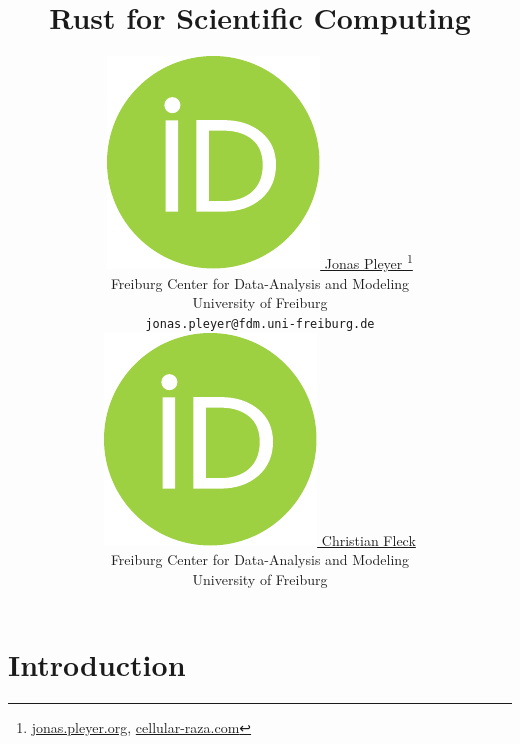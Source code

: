 \documentclass{article}
\title{Rust for Scientific Computing}
\author{
    \href{https://orcid.org/0009-0001-0613-7978}{
        \includegraphics[scale=0.06]{orcid.pdf}
        \hspace{1mm}Jonas Pleyer
    }
    \thanks{
        \href{https://jonas.pleyer.org}{jonas.pleyer.org},
        \href{https://cellular-raza.com}{cellular-raza.com}
    }\\
    Freiburg Center for Data-Analysis and Modeling\\
    University of Freiburg\\
    \texttt{jonas.pleyer@fdm.uni-freiburg.de} \\
    \And
    \href{https://orcid.org/0000-0002-6371-4495}{
        \includegraphics[scale=0.06]{orcid.pdf}
        \hspace{1mm}Christian Fleck
    }\\
    Freiburg Center for Data-Analysis and Modeling\\
    University of Freiburg
}
\begin{document}
\maketitle

\begin{abstract}
\end{abstract}

\pagebreak
\tableofcontents

\twocolumn
\pagebreak


\section{Introduction}
\label{section:introduction}
\end{document}
